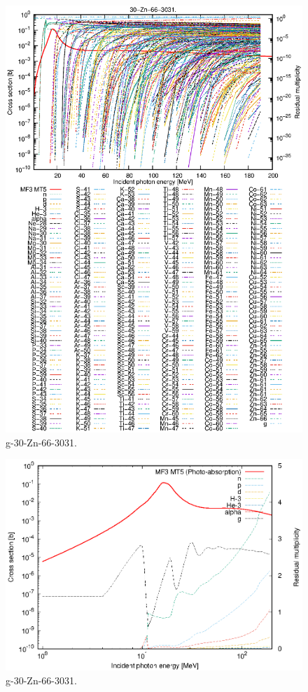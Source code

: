 \begin{figure}
 \includegraphics[width=\linewidth]{eps/g_30-Zn-66_3031.eps}
  \caption{g-30-Zn-66-3031.}
\end{figure}
\newpage \clearpage

\begin{figure}
 \includegraphics[width=\linewidth]{eps-log/g_30-Zn-66_3031.eps}
 \caption{g-30-Zn-66-3031.}
\end{figure}
\newpage \clearpage

